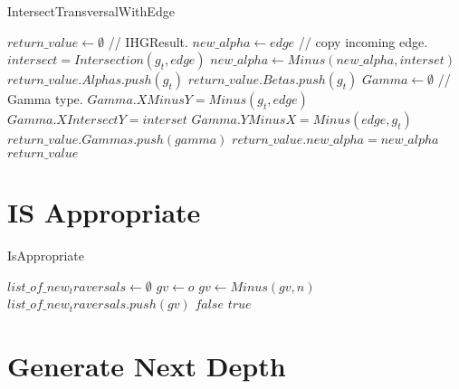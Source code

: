 \newpage
\begin{algorithm}
	\caption{IntersectTransversalWithEdge}\label{IntersectTransversalWithEdge}
	\begin{algorithmic}[1]
		\State $return\_value \gets \emptyset$ // IHGResult.
		\State $new\_alpha \gets edge$ // copy incoming edge.
		\State $intersect = Intersection(g_t,edge)$
		\State $new\_alpha \gets Minus(new\_alpha,interset)$
		\State $return\_value.Alphas.push(g_t)$
		\Else
		\State $return\_value.Betas.push(g_t)$		
		\Else
		\State $Gamma \gets \emptyset$ // Gamma type.
		\State $Gamma.XMinusY = Minus(g_t,edge)$
		\State $Gamma.XIntersectY = interset$
		\State $Gamma.YMinusX = Minus(edge,g_t)$
		\State $return\_value.Gammas.push(gamma)$
		\EndIf
		\EndIf
		\EndFor
		\State $return\_value.new\_alpha = new\_alpha$
		\State \Return $return\_value$
		\EndFunction
	\end{algorithmic}
\end{algorithm}

\section{IS Appropriate}

\begin{algorithm}
	\caption{IsAppropriate}\label{IsAppropriate}
	\begin{algorithmic}[1]
		\State $list\_of\_new_traversals \gets \emptyset$
		\State $gv \gets o$
		\State $gv \gets Minus(gv,n)$
		\EndIf
		\EndFor
			\State $list\_of\_new_traversals.push(gv)$
			\EndIf
		\EndFor
		\State \Return $false$
		\EndIf
		\State \Return $true$
		\EndFunction
	\end{algorithmic}
\end{algorithm}


\section{Generate Next Depth}

